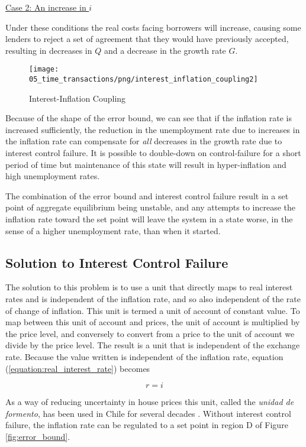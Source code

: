 \underline{Case 2: An increase in $i$} 

Under these conditions the real costs facing borrowers will increase, causing some lenders to reject
a set of agreement that they would have previously accepted, resulting in decreases in $Q$ and a
decrease in the growth rate $G$.

\begin{figure}[H]
\centering
\texttt{[image: 05\_time\_transactions/png/interest\_inflation\_coupling2]}
\caption{Interest-Inflation Coupling}
\label{fig:interest_inflation_coupling2}
\end{figure}

Because of the shape of the error bound, we can see that if the inflation rate is increased
sufficiently, the reduction in the unemployment rate due to increases in the inflation rate can
compensate for \emph{all} decreases in the growth rate due to interest control failure. It is
possible to double-down on control-failure for a short period of time but maintenance of this state
will result in hyper-inflation and high unemployment rates.

The combination of the error bound and interest control failure result in a set point of aggregate
equilibrium being unstable, and any attempts to increase the inflation rate toward the set point
will leave the system in a state worse, in the sense of a higher unemployment rate, than when it
started.

\subsection{Solution to Interest Control Failure}
\label{sec:constant_purchasing_power}

The solution to this problem is to use a unit that directly maps to real interest rates and is
independent of the inflation rate, and so also independent of the rate of change of inflation. This
unit is termed a unit of account of constant value. To map between this unit of account and prices,
the unit of account is multiplied by the price level, and conversely to convert from a price to the
unit of account we divide by the price level. The result is a unit that is independent of the
exchange rate. Because the value written is independent of the inflation rate, equation
(\ref{equation:real_interest_rate}) becomes

\[
    r = i
\]

As a way of reducing uncertainty in house prices this unit, called the \textit{unidad de formento},
has been used in Chile for several decades \cite{shiller1998}. Without interest control failure, the
inflation rate can be regulated to a set point in region D of Figure \ref{fig:error_bound}. 














